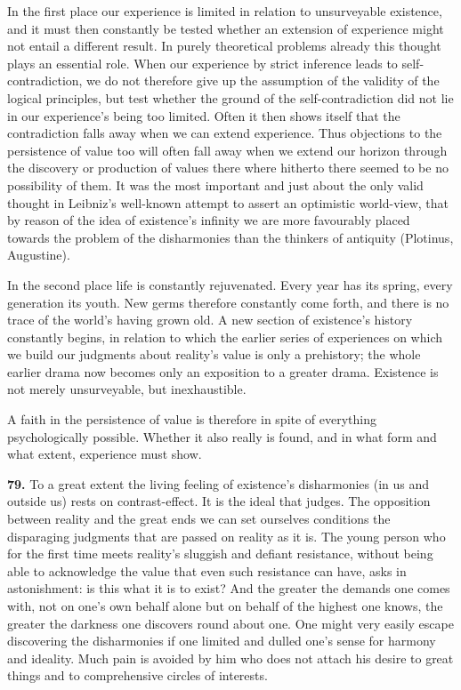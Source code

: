 \documentclass[12pt,a4paper]{book}
\newcommand{\opage}[1]{\marginnote{\footnotesize\textit{[#1]}}}
\begin{document}
In the first place our experience is limited in relation to unsurveyable existence, and it must then
constantly be tested whether an extension of experience might not entail a different result. In purely
theoretical problems already this thought plays an essential role. When our experience by strict
inference leads to self-contradiction, we do not therefore give up the assumption of the validity of the
logical principles, but test whether the ground of the self-contradiction did not lie in our experience's
being too limited. Often it then shows itself that the contradiction falls away when we can extend
experience. Thus objections to the persistence of value too will often fall away when we extend our
horizon through the discovery or production of values there where hitherto there seemed to be no
possibility of them. It was the most important and just about the only valid thought in Leibniz's
well-known attempt to assert an optimistic world-view, that by reason of the idea of existence's
infinity we are more favourably placed towards the problem of the disharmonies than the thinkers of
antiquity (Plotinus, Augustine).

In the second place life is constantly rejuvenated. Every year has its spring, every generation its
youth. New germs therefore constantly come forth, and there is no trace of the world's having grown old.
A new section of existence's history constantly begins, in relation to which the earlier series of
experiences on which we build our judgments about reality's value is only a prehistory; the whole earlier
drama now becomes only an exposition to a greater drama. Existence is not merely unsurveyable, but
inexhaustible.

\opage{184}A faith in the persistence of value is therefore in spite of everything psychologically possible. Whether
it also really is found, and in what form and what extent, experience must show.

\medskip

\noindent\textbf{79.} To a great extent the living feeling of existence's disharmonies (in us and outside
us) rests on contrast-effect. It is the ideal that judges. The opposition between reality and the great
ends we can set ourselves conditions the disparaging judgments that are passed on reality as it is. The
young person who for the first time meets reality's sluggish and defiant resistance, without being able to
acknowledge the value that even such resistance can have, asks in astonishment: is this what it is to
exist? And the greater the demands one comes with, not on one's own behalf alone but on behalf of the
highest one knows, the greater the darkness one discovers round about one. One might very easily escape
discovering the disharmonies if one limited and dulled one's sense for harmony and ideality. Much pain is
avoided by him who does not attach his desire to great things and to comprehensive circles of interests.
\end{document}
